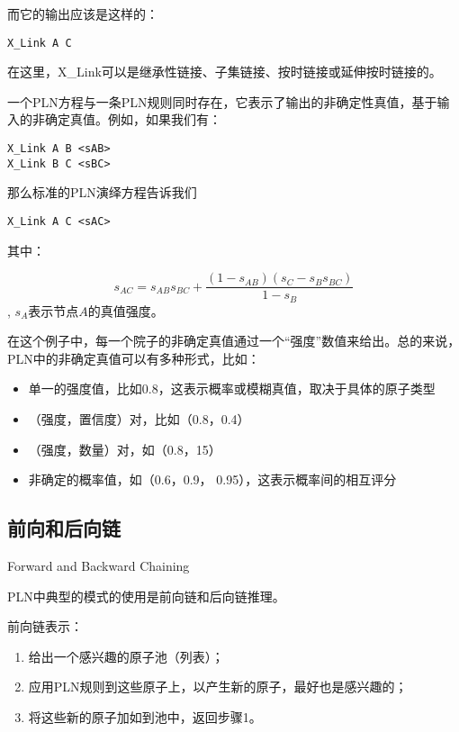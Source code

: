 而它的输出应该是这样的：

{\tt\begin{small}\begin{lstlisting}
X_Link A C
\end{lstlisting}\end{small}}

在这里，X\_Link可以是继承性链接、子集链接、按时链接或延伸按时链接的。

一个PLN方程与一条PLN规则同时存在，它表示了输出的非确定性真值，基于输入的非确定真值。例如，如果我们有：

{\tt\begin{small}\begin{lstlisting}
X_Link A B <sAB>
X_Link B C <sBC>
\end{lstlisting}\end{small}}



那么标准的PLN演绎方程告诉我们

{\tt\begin{small}\begin{lstlisting}
X_Link A C <sAC>
\end{lstlisting}\end{small}}

其中： 

$$
s_{AC}=s_{AB}s_{BC}+\frac{\left(1-s_{AB}\right)\left(s_C-s_Bs_{BC}\right)}{1-s_B}
$$, $s_A$表示节点$A$的真值强度。

在这个例子中，每一个院子的非确定真值通过一个“强度”数值来给出。总的来说，PLN中的非确定真值可以有多种形式，比如：

\begin{itemize}
\item 单一的强度值，比如0.8，这表示概率或模糊真值，取决于具体的原子类型
\item （强度，置信度）对，比如（0.8，0.4）
\item （强度，数量）对，如（0.8，15）
\item 非确定的概率值，如（0.6，0.9， 0.95），这表示概率间的相互评分
\end{itemize}

\subsection{前向和后向链}{Forward and Backward Chaining}

PLN中典型的模式的使用是前向链和后向链推理。

前向链表示：

\begin{enumerate}
\item 给出一个感兴趣的原子池（列表）；
\item 应用PLN规则到这些原子上，以产生新的原子，最好也是感兴趣的；
\item 将这些新的原子加如到池中，返回步骤1。
\end{enumerate}

